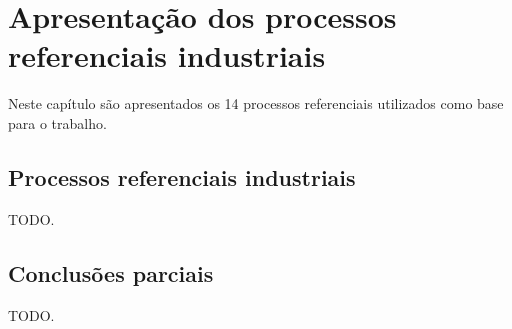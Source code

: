\chapter{Apresentação dos processos referenciais industriais
    \label{cap:processos-referenciais}}

Neste capítulo são apresentados os 14 processos referenciais utilizados
como base para o trabalho.

\section{Processos referenciais industriais}

    TODO.

\section{Conclusões parciais}

    TODO.
